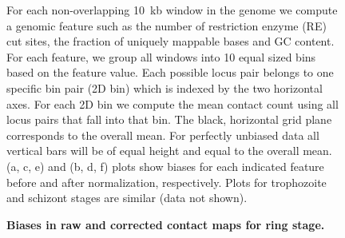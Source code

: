 \begin{figure}
  \begin{center}
   \hspace{0.03\textwidth}
  \newline
   \hspace{0.03\textwidth}
  \newline
   \hspace{0.03\textwidth}
  \end{center}
  \caption{{\bf  Biases in raw and corrected contact maps for ring stage.}}
{ For each non-overlapping 10~kb window in the genome we compute a genomic feature such as
  the number of restriction enzyme (RE) cut sites, the fraction of uniquely mappable bases and GC content.
  For each feature, we group all windows into 10 equal sized bins based on the feature value.
  Each possible locus pair belongs to one specific bin pair (2D bin) which is indexed by the two
  horizontal axes. For each 2D bin we compute the mean contact count using all locus pairs that fall
  into that bin. The black, horizontal grid plane corresponds to the overall mean.
  For perfectly unbiased data all vertical bars will be of equal height and equal to the overall mean.
  (a, c, e) and (b, d, f) plots show biases for each indicated feature before and after normalization,
  respectively. Plots for trophozoite and schizont stages are similar (data not shown).}
\label{suppfig:ICE}
\end{figure}
\clearpage




